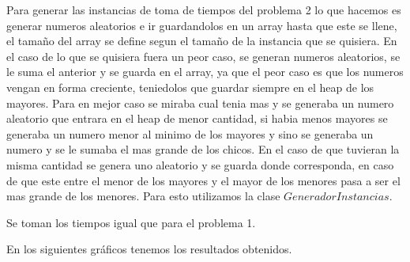 Para generar las instancias de toma de tiempos del problema 2 lo que hacemos es generar numeros aleatorios e ir guardandolos en un array hasta que este se llene, el tamaño del array se define segun el tamaño de la instancia que se quisiera. En el caso de lo que se quisiera fuera un peor caso, se generan numeros aleatorios, se le suma el anterior y se guarda en el array, ya que el peor caso es que los numeros vengan en forma creciente, teniedolos que guardar siempre en el heap de los mayores. Para en mejor caso se miraba cual tenia mas y se generaba un numero aleatorio que entrara en el heap de menor cantidad, si habia menos mayores se generaba un numero menor al minimo de los mayores y sino se generaba un numero y se le sumaba el mas grande de los chicos. En el caso de que tuvieran la misma cantidad se genera uno aleatorio y se guarda donde corresponda, en caso de que este entre el menor de los mayores y el mayor de los menores pasa a ser el mas grande de los menores. Para esto utilizamos la clase $ GeneradorInstancias $.

Se toman los tiempos igual que para el problema 1.


 En los siguientes gráficos tenemos los resultados obtenidos.

